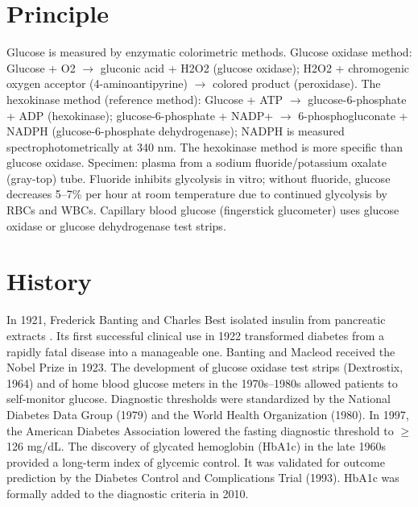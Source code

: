 \section*{Principle}
Glucose is measured by enzymatic colorimetric methods. Glucose oxidase method: Glucose + O2 $\rightarrow$ gluconic acid + H2O2 (glucose oxidase); H2O2 + chromogenic oxygen acceptor (4-aminoantipyrine) $\rightarrow$ colored product (peroxidase). The hexokinase method (reference method): Glucose + ATP $\rightarrow$ glucose-6-phosphate + ADP (hexokinase); glucose-6-phosphate + NADP+ $\rightarrow$ 6-phosphogluconate + NADPH (glucose-6-phosphate dehydrogenase); NADPH is measured spectrophotometrically at 340 nm. The hexokinase method is more specific than glucose oxidase. Specimen: plasma from a sodium fluoride/potassium oxalate (gray-top) tube. Fluoride inhibits glycolysis in vitro; without fluoride, glucose decreases 5--7\% per hour at room temperature due to continued glycolysis by RBCs and WBCs. Capillary blood glucose (fingerstick glucometer) uses glucose oxidase or glucose dehydrogenase test strips.
\section*{History}
In 1921, Frederick Banting and Charles Best isolated insulin from pancreatic extracts \cite{banting1922internal}. Its first successful clinical use in 1922 transformed diabetes from a rapidly fatal disease into a manageable one. Banting and Macleod received the Nobel Prize in 1923. The development of glucose oxidase test strips (Dextrostix, 1964) and of home blood glucose meters in the 1970s--1980s allowed patients to self-monitor glucose. Diagnostic thresholds were standardized by the National Diabetes Data Group (1979) and the World Health Organization (1980). In 1997, the American Diabetes Association lowered the fasting diagnostic threshold to $\geq$126 mg/dL. The discovery of glycated hemoglobin (HbA1c) in the late 1960s provided a long-term index of glycemic control. It was validated for outcome prediction by the Diabetes Control and Complications Trial (1993). HbA1c was formally added to the diagnostic criteria in 2010.
